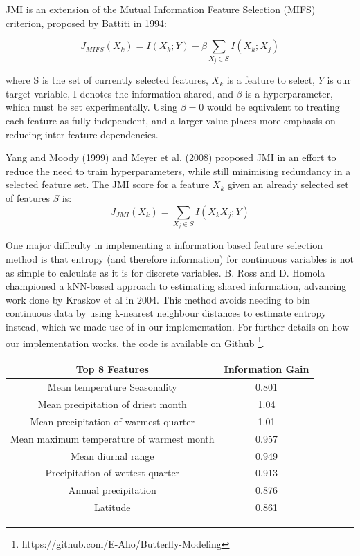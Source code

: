 \documentclass[prl,showpacs,superscriptaddress,twocolumn,longbibliography]{revtex4-1}
\begin{document}
JMI is an extension of the Mutual Information Feature Selection (MIFS) criterion, proposed by Battiti in 1994:

\[ 
    J_{MIFS}(X_k) = I(X_k;Y) - \beta \sum_{X_j\in S} I(X_k;X_j)
\]

where S is the set of currently selected features, $X_k$ is a feature to select, $Y$ is our target variable, I denotes the information shared,  and $ \beta $ is a hyperparameter, which must be set experimentally. Using $\beta  = 0 $ would be equivalent to treating each feature as fully independent, and a larger value places more emphasis on reducing inter-feature dependencies. 

Yang and Moody (1999) and Meyer et al. (2008) proposed JMI in an effort to reduce the need to train hyperparameters, while still minimising redundancy in a selected feature set\cite{Brown2012}. The JMI score for a feature $X_k$ given an already selected set of features $S$ is:
\[ 
    J_{JMI}(X_k) =  \sum_{X_j\in S} I(X_kX_j;Y)
\]

One major difficulty in implementing a information based feature selection method is that entropy (and therefore information) for continuous variables is not as simple to calculate as it is for discrete variables. B. Ross\cite{Ross2014} and D. Homola \cite{Homola2016} championed a kNN-based approach to estimating shared information, advancing work done by Kraskov et al in 2004\cite{kraskov_estimating_2004}. This method avoids needing to bin continuous data by using k-nearest neighbour distances to estimate entropy instead, which we made use of in our implementation. For further details on how our implementation works, the code is available on Github \footnote{https://github.com/E-Aho/Butterfly-Modeling}.


\begin{center}
\begin{tabular}{||c c||} 
 \hline
Top 8 Features & Information Gain \\
 \hline\hline
 Mean temperature Seasonality & 0.801\\ 
 \hline
 Mean precipitation of driest month & 1.04\\
  \hline
 Mean precipitation of warmest quarter &  1.01\\
 \hline
 Mean maximum temperature of warmest month &  0.957\\
 \hline
 Mean diurnal range & 0.949\\
 \hline
 Precipitation of wettest quarter & 0.913\\
 \hline
 Annual precipitation & 0.876\\
 \hline
 Latitude & 0.861\\ [1ex] 
 \hline
\end{tabular}
\end{center}
\end{document}
